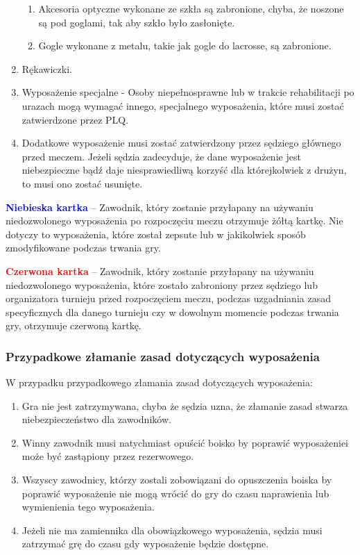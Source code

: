 \documentclass[12pt]{article}
\newcommand\redcard[1]{\bgroup\textcolor{red}{\textbf{#1}}}
\newcommand\bluecard[1]{\bgroup\textcolor{blue}{\textbf{#1}}}
\begin{document}
\begin{enumerate}
	      \begin{enumerate}
		      \item
		            Akcesoria optyczne wykonane ze szkła są zabronione, chyba, że
		            noszone są pod goglami, tak aby szkło było zasłonięte.
		      \item
		            Gogle wykonane z metalu, takie jak gogle do lacrosse, są zabronione.
	      \end{enumerate}
	\item
	      Rękawiczki.
	\item
	      Wyposażenie specjalne - Osoby niepełnosprawne lub w trakcie
	      rehabilitacji po urazach mogą wymagać innego, specjalnego wyposażenia,
	      które musi zostać zatwierdzone przez PLQ.
	\item
	      Dodatkowe wyposażenie musi zostać zatwierdzony przez sędziego
	      głównego przed meczem. Jeżeli sędzia zadecyduje, że dane wyposażenie
	      jest niebezpieczne bądź daje niesprawiedliwą korzyść dla którejkolwiek
	      z drużyn, to musi ono zostać usunięte.
\end{enumerate}

\bluecard{Niebieska kartka} -- Zawodnik, który zostanie przyłapany na
używaniu niedozwolonego wyposażenia po rozpoczęciu meczu otrzymuje żółtą
kartkę. Nie dotyczy to wyposażenia, które został zepsute lub w
jakikolwiek sposób zmodyfikowane podczas trwania gry.

\redcard{Czerwona kartka} -- Zawodnik, który zostanie przyłapany na używaniu
niedozwolonego wyposażenia, które zostało zabroniony przez sędziego lub
organizatora turnieju przed rozpoczęciem meczu, podczas uzgadniania
zasad specyficznych dla danego turnieju czy w dowolnym momencie podczas
trwania gry, otrzymuje czerwoną kartkę.

\subsubsection{Przypadkowe złamanie zasad dotyczących wyposażenia}
W przypadku przypadkowego złamania zasad dotyczących wyposażenia:

\begin{enumerate}
	\item
	      Gra nie jest zatrzymywana, chyba że sędzia uzna, że złamanie zasad
	      stwarza niebezpieczeństwo dla zawodników.
	\item
	      Winny zawodnik musi natychmiast opuścić boisko by poprawić
	      wyposażeniei może być zastąpiony przez rezerwowego.
	\item
	      Wszyscy zawodnicy, którzy zostali zobowiązani do opuszczenia boiska by
	      poprawić wyposażenie nie mogą wrócić do gry do czasu naprawienia lub
	      wymienienia tego wyposażenia.
	\item
	      Jeżeli nie ma zamiennika dla obowiązkowego wyposażenia, sędzia musi
	      zatrzymać grę do czasu gdy wyposażenie będzie dostępne.
\end{enumerate}
\end{document}
